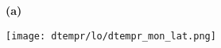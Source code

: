 \documentclass[preview]{standalone}
\begin{document}
\begin{figure}


%     

%     

%     


  \begin{subfigure}[t]{0.05\textwidth}
    \textbf{\large{(a)}}
  \end{subfigure}
  \begin{subfigure}[t]{0.95\textwidth}
    \texttt{[image: dtempr/lo/dtempr\_mon\_lat.png]}
  \end{subfigure}


\end{figure}
\end{document}
